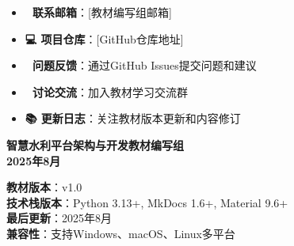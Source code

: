 \begin{itemize}
\tightlist
\item
  \textbf{📧 联系邮箱}：{[}教材编写组邮箱{]}
\item
  \textbf{💻 项目仓库}：{[}GitHub仓库地址{]}
\item
  \textbf{🐛 问题反馈}：通过GitHub Issues提交问题和建议
\item
  \textbf{💬 讨论交流}：加入教材学习交流群
\item
  \textbf{📚 更新日志}：关注教材版本更新和内容修订
\end{itemize}

\textbf{智慧水利平台架构与开发教材编写组}\\
\textbf{2025年8月}

\begin{tcolorbox}[colback=yellow!5!white,colframe=yellow!75!black,title=版本信息]
\textbf{教材版本}：v1.0 \\
\textbf{技术栈版本}：Python 3.13+, MkDocs 1.6+, Material 9.6+ \\
\textbf{最后更新}：2025年8月 \\
\textbf{兼容性}：支持Windows、macOS、Linux多平台
\end{tcolorbox}
